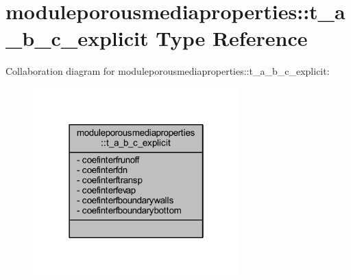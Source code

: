 \hypertarget{structmoduleporousmediaproperties_1_1t__a__b__c__explicit}{}\section{moduleporousmediaproperties\+:\+:t\+\_\+a\+\_\+b\+\_\+c\+\_\+explicit Type Reference}
\label{structmoduleporousmediaproperties_1_1t__a__b__c__explicit}


Collaboration diagram for moduleporousmediaproperties\+:\+:t\+\_\+a\+\_\+b\+\_\+c\+\_\+explicit\+:\nopagebreak
\begin{figure}[H]
\begin{center}
\leavevmode
\includegraphics[width=226pt]{structmoduleporousmediaproperties_1_1t__a__b__c__explicit__coll__graph}
\end{center}
\end{figure}
